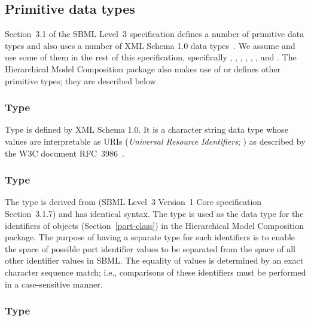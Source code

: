\subsection{Primitive data types}
\label{new-primitive-types}

Section~3.1 of the SBML Level~3 specification defines a number of
primitive data types and also uses a number of XML Schema 1.0 data
types~\citep{biron:2000}.  We assume and use some of them in the rest of
this specification, specifically , ,
, , ,
, and .  The Hierarchical Model
Composition package also makes use of or defines other primitive types;
they are described below.


\subsubsection{Type \fixttspace{}}
\label{primtype-anyuri}
\label{primtype-uri}

Type  is defined by XML Schema 1.0.  It is a character
string data type whose values are interpretable as URIs (\emph{Universal
  Resource Identifiers}; \citealt{harold:2001,w3c:2000}) as described by
the W3C document RFC~3986~\citep{rfc3986}.


\subsubsection{Type \fixttspace{}}
\label{primtype-portid}

The type  is derived from  (SBML Level~3
Version~1 Core specification Section~3.1.7) and has identical syntax.
The  type is used as the data type for the identifiers
of \Port objects (Section~\ref{port-class}) in the Hierarchical Model Composition
package.  The purpose of having a separate type for such identifiers is
to enable the space of possible port identifier values to be separated
from the space of all other identifier values in SBML.  The equality of
 values is determined by an exact character sequence
match; i.e., comparisons of these identifiers must be performed in a
case-sensitive manner.


\subsubsection{Type \fixttspace{}}
\label{primtype-portidref}

